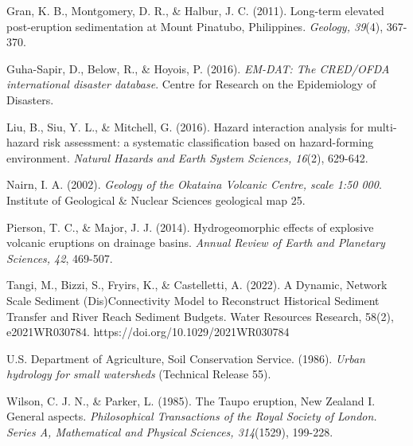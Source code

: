 \documentclass[12pt, a4paper]{article}
\begin{document}
\begin{thebibliography}{}
Gran, K. B., Montgomery, D. R., \& Halbur, J. C. (2011). Long-term elevated post-eruption sedimentation at Mount Pinatubo, Philippines. \textit{Geology, 39}(4), 367-370.

Guha-Sapir, D., Below, R., \& Hoyois, P. (2016). \textit{EM-DAT: The CRED/OFDA international disaster database}. Centre for Research on the Epidemiology of Disasters.

Liu, B., Siu, Y. L., \& Mitchell, G. (2016). Hazard interaction analysis for multi-hazard risk assessment: a systematic classification based on hazard-forming environment. \textit{Natural Hazards and Earth System Sciences, 16}(2), 629-642.

Nairn, I. A. (2002). \textit{Geology of the Okataina Volcanic Centre, scale 1:50 000}. Institute of Geological \& Nuclear Sciences geological map 25.

Pierson, T. C., \& Major, J. J. (2014). Hydrogeomorphic effects of explosive volcanic eruptions on drainage basins. \textit{Annual Review of Earth and Planetary Sciences, 42}, 469-507.

Tangi, M., Bizzi, S., Fryirs, K., & Castelletti, A. (2022). A Dynamic, Network Scale Sediment (Dis)Connectivity Model to Reconstruct Historical Sediment Transfer and River Reach Sediment Budgets. Water Resources Research, 58(2), e2021WR030784. https://doi.org/10.1029/2021WR030784

U.S. Department of Agriculture, Soil Conservation Service. (1986). \textit{Urban hydrology for small watersheds} (Technical Release 55).

Wilson, C. J. N., \& Parker, L. (1985). The Taupo eruption, New Zealand I. General aspects. \textit{Philosophical Transactions of the Royal Society of London. Series A, Mathematical and Physical Sciences, 314}(1529), 199-228.

\end{thebibliography}
\end{document}

